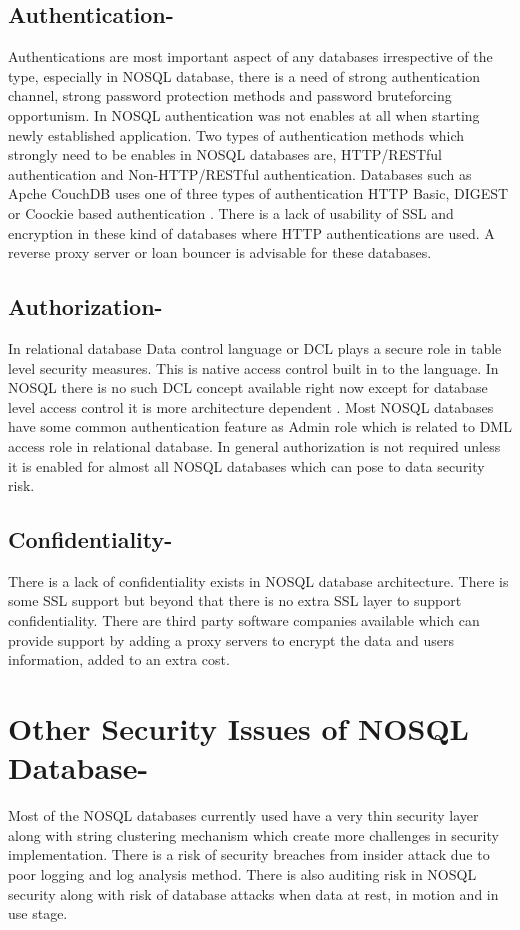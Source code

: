 \documentclass[sigconf]{acmart}
\begin{document}
\subsection{Authentication-} Authentications are most important aspect of any databases irrespective of the type, especially in NOSQL database, there is a need of strong authentication channel, strong password protection methods and password bruteforcing opportunism.  In NOSQL authentication was not enables at all when starting newly established application. Two types of authentication methods which strongly need to be enables in NOSQL databases are, HTTP/RESTful authentication and Non-HTTP/RESTful authentication. Databases such as Apche CouchDB uses one of three types of authentication HTTP Basic, DIGEST or Coockie based authentication \cite{editor03}. There is a lack of usability of SSL and encryption in these kind of databases where HTTP authentications are used. A reverse proxy server or loan bouncer is advisable for these databases. 

\subsection{Authorization-} In relational database Data control language or DCL plays a secure role in table level security measures. This is native access control built in to the language. In NOSQL there is no such DCL concept available right now except for database level access control it is more architecture dependent \cite{editor04}.  Most NOSQL databases have some common authentication feature as Admin role which is related to DML access role in relational database. In general authorization is not required unless it is enabled for almost all NOSQL databases which can pose to data security risk.


\subsection{Confidentiality-} There is a lack of confidentiality exists in NOSQL database architecture. There is some SSL support but beyond that there is no extra SSL layer to support confidentiality\cite{editor03}. There are third party software companies available which can provide support by adding a proxy servers to encrypt the data and users information, added to an extra cost. 

\section{Other Security Issues of NOSQL Database-} Most of the NOSQL databases currently used have a very thin security layer along with string clustering mechanism which create more challenges in security implementation. There is a risk of security breaches from insider attack due to poor logging and log analysis method. There is also auditing risk in NOSQL security along with risk of database attacks when data at rest, in motion and in use stage. 
\end{document}

